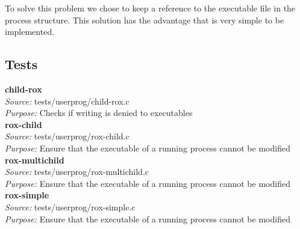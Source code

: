 	To solve this problem we chose to keep a reference to the executable file in the process structure. This solution has the advantage that is very simple to be implemented.

    \subsection{Tests}

    \textbf{child-rox}\\
    \textit{Source:} tests/userprog/child-rox.c\\
    \textit{Purpose:} Checks if writing is denied to executables\\

    \textbf{rox-child}\\
    \textit{Source:} tests/userprog/rox-child.c\\
    \textit{Purpose:} Ensure that the executable of a running process cannot be modified\\    

    \textbf{rox-multichild}\\
    \textit{Source:} tests/userprog/rox-multichild.c\\
    \textit{Purpose:} Ensure that the executable of a running process cannot be modified\\
    
    \textbf{rox-simple}\\
    \textit{Source:} tests/userprog/rox-simple.c\\
    \textit{Purpose:} Ensure that the executable of a running process cannot be modified\\    
  
